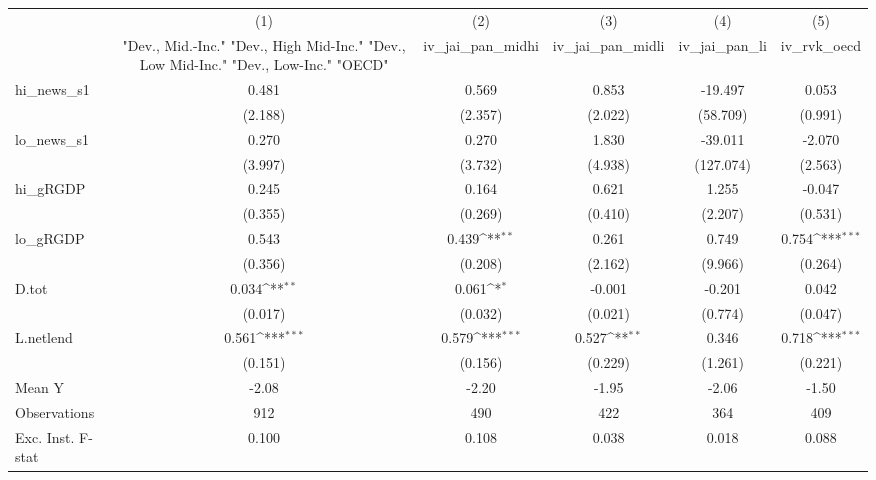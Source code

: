 {
\def\sym#1{\ifmmode^{#1}\else\(^{#1}\)\fi}
\begin{tabular}{l*{5}{c}}
\toprule
            &\multicolumn{1}{c}{(1)}&\multicolumn{1}{c}{(2)}&\multicolumn{1}{c}{(3)}&\multicolumn{1}{c}{(4)}&\multicolumn{1}{c}{(5)}\\
            &\multicolumn{1}{c}{ "Dev., Mid.-Inc." "Dev., High Mid-Inc." "Dev., Low Mid-Inc." "Dev., Low-Inc." "OECD" }&\multicolumn{1}{c}{iv\_jai\_pan\_midhi}&\multicolumn{1}{c}{iv\_jai\_pan\_midli}&\multicolumn{1}{c}{iv\_jai\_pan\_li}&\multicolumn{1}{c}{iv\_rvk\_oecd}\\
\midrule
hi\_news\_s1  &       0.481         &       0.569         &       0.853         &     -19.497         &       0.053         \\
            &     (2.188)         &     (2.357)         &     (2.022)         &    (58.709)         &     (0.991)         \\
\addlinespace
lo\_news\_s1  &       0.270         &       0.270         &       1.830         &     -39.011         &      -2.070         \\
            &     (3.997)         &     (3.732)         &     (4.938)         &   (127.074)         &     (2.563)         \\
\addlinespace
hi\_gRGDP    &       0.245         &       0.164         &       0.621         &       1.255         &      -0.047         \\
            &     (0.355)         &     (0.269)         &     (0.410)         &     (2.207)         &     (0.531)         \\
\addlinespace
lo\_gRGDP    &       0.543         &       0.439\sym{**} &       0.261         &       0.749         &       0.754\sym{***}\\
            &     (0.356)         &     (0.208)         &     (2.162)         &     (9.966)         &     (0.264)         \\
\addlinespace
D.tot       &       0.034\sym{**} &       0.061\sym{*}  &      -0.001         &      -0.201         &       0.042         \\
            &     (0.017)         &     (0.032)         &     (0.021)         &     (0.774)         &     (0.047)         \\
\addlinespace
L.netlend   &       0.561\sym{***}&       0.579\sym{***}&       0.527\sym{**} &       0.346         &       0.718\sym{***}\\
            &     (0.151)         &     (0.156)         &     (0.229)         &     (1.261)         &     (0.221)         \\
\midrule
Mean Y      &       -2.08         &       -2.20         &       -1.95         &       -2.06         &       -1.50         \\
Observations&         912         &         490         &         422         &         364         &         409         \\
Exc. Inst. F-stat&       0.100         &       0.108         &       0.038         &       0.018         &       0.088         \\
\bottomrule
\end{tabular}
}
